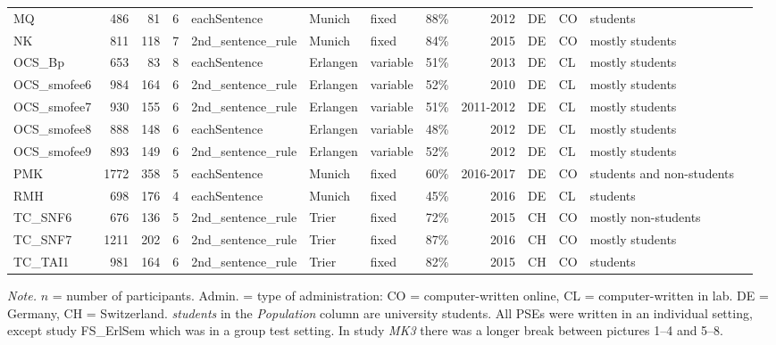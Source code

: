 \documentclass[man,a4paper,mask]{apa6}\usepackage[]{graphicx}\usepackage[]{color}
\begin{document}
\begin{table}
\begin{threeparttable}
\begin{tabularx}{\textwidth}{lrrrlllrrllll}
  MQ & 486 &  81 &   6 & eachSentence & Munich & fixed & 88\% & 2012 & DE & CO & students \\ 
  NK & 811 & 118 &   7 & 2nd\_sentence\_rule & Munich & fixed & 84\% & 2015 & DE & CO & mostly students \\ 
  OCS\_Bp & 653 &  83 &   8 & eachSentence & Erlangen & variable & 51\% & 2013 & DE & CL & mostly students \\ 
  OCS\_smofee6 & 984 & 164 &   6 & 2nd\_sentence\_rule & Erlangen & variable & 52\% & 2010 & DE & CL & mostly students \\ 
  OCS\_smofee7 & 930 & 155 &   6 & 2nd\_sentence\_rule & Erlangen & variable & 51\% & 2011-2012 & DE & CL & mostly students \\ 
  OCS\_smofee8 & 888 & 148 &   6 & eachSentence & Erlangen & variable & 48\% & 2012 & DE & CL & mostly students \\ 
  OCS\_smofee9 & 893 & 149 &   6 & 2nd\_sentence\_rule & Erlangen & variable & 52\% & 2012 & DE & CL & mostly students \\ 
  PMK & 1772 & 358 &   5 & eachSentence & Munich & fixed & 60\% & 2016-2017 & DE & CO & students and non-students \\ 
  RMH & 698 & 176 &   4 & eachSentence & Munich & fixed & 45\% & 2016 & DE & CL & students \\ 
  TC\_SNF6 & 676 & 136 &   5 & 2nd\_sentence\_rule & Trier & fixed & 72\% & 2015 & CH & CO & mostly non-students \\ 
  TC\_SNF7 & 1211 & 202 &   6 & 2nd\_sentence\_rule & Trier & fixed & 87\% & 2016 & CH & CO & mostly students \\ 
  TC\_TAI1 & 981 & 164 &   6 & 2nd\_sentence\_rule & Trier & fixed & 82\% & 2015 & CH & CO & students \\ 
   \hline


		\bottomrule
		\end{tabularx}
		\begin{tablenotes}[para,flushleft]
			{\small
			\vspace*{0.75em}
			\textit{Note.} $n$ = number of participants. Admin. = type of administration: CO = computer-written online, CL = computer-written in lab. DE = Germany, CH = Switzerland.  \emph{students} in the \emph{Population} column are university students. All PSEs were written in an individual setting, except study FS\_ErlSem which was in a group test setting. In study \emph{MK3} there was a longer break between pictures 1--4 and 5--8.}
    \end{tablenotes}
\end{threeparttable}
\end{table}
\end{document}
